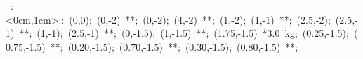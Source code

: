 \hbox{
\xy    <1cm,0cm>:<0cm,1cm>::
       (0,0); (0,-2) **\dir{-};
       (0,-2); (4,-2) **\dir{-};
       (1,-2); (1,-1) **\dir{-};
       (2.5,-2); (2.5,-1) **\dir{-};
       (1,-1); (2.5,-1) **\dir{-};
       (0,-1.5); (1,-1.5) **\dir{-};
	   (1.75,-1.5) *{\hbox{3.0 kg}};
       (0.25,-1.5); (0.75,-1.5) **;
       (0.20,-1.5); (0.70,-1.5) **;
       (0.30,-1.5); (0.80,-1.5) **;
       \endxy}




